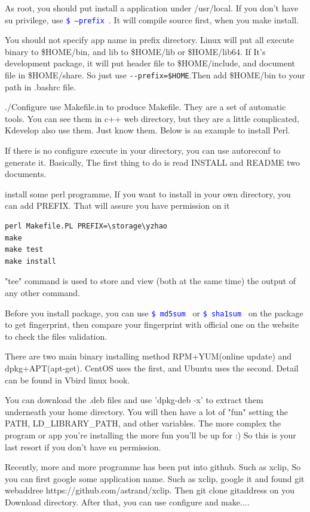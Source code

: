 \documentclass[paper=8.5in:11in, twoside, 12pt, pagesize=pdftex]{book}
\newcommand{\linuxcommand}[1]{\texttt{\textcolor{blue}{\$ #1 \Pisymbol{psy}{191}}}}
\begin{document}
     As root, you should put install a application under /usr/local. If you don't have su privilege, use \linuxcommand{--prefix}.  It will compile source first, when you make install.

	 You should not specify app name in prefix directory. Linux will put all execute binary to \$HOME/bin, and lib to \$HOME/lib or \$HOME/lib64. If It's development package, it will put header file to \$HOME/include, and document file in \$HOME/share. So just use \verb!--prefix=$HOME!.Then add \$HOME/bin to your path in .bashrc file.  
	
	 ./Configure use Makefile.in to produce Makefile. They are a set of automatic tools. You can see them in c++ web directory, but they are a little complicated, Kdevelop also use them.  Just know them.  Below is an example to install Perl.

	 If there is no configure execute in your directory, you can use autoreconf to generate it. Basically, The first thing to do is read INSTALL and README two documents. 

	 install some perl programme, If you want to install in your own directory, you can add PREFIX. That will assure you have permission on it
\begin{verbatim}
perl Makefile.PL PREFIX=\storage\yzhao
make
make test
make install
\end{verbatim}

	"tee" command is used to store and view (both at the same time) the output of any other command. 

	Before you install package, you can use \linuxcommand{md5sum} or \linuxcommand{sha1sum} on the package to get fingerprint, then compare your fingerprint with official one on the website to check the files validation.  
				
	There are two main binary installing method RPM+YUM(online update) and dpkg+APT(apt-get). CentOS uses the first, and Ubuntu uses the second. Detail can be found in Vbird linux book.

		You can download the .deb files and use 'dpkg-deb -x' to extract them underneath your home directory. You will then have a lot of "fun" setting the PATH, LD\_LIBRARY\_PATH, and other variables. The more complex the program or app you're installing the more fun you'll be up for :) So this is your last resort if you don't have su permission.

		Recently, more and more programme has been put into github. Such as xclip, So you can first google some application name. Such as xclip, google it and found git webaddree https://github.com/astrand/xclip. Then git clone gitaddress on you Download directory. After that, you can use configure and make....
\end{document}
